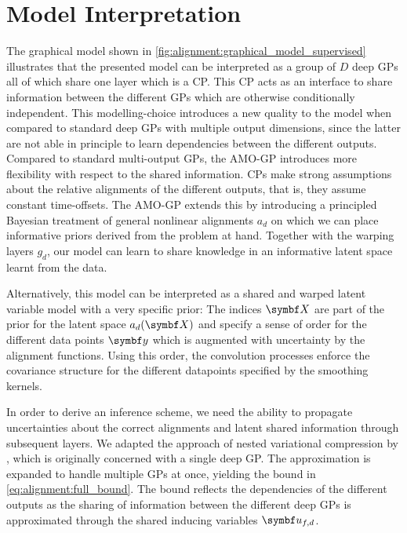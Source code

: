 \section{Model Interpretation}
\label{toc:alignment:interpretation}
The graphical model shown in \cref{fig:alignment:graphical_model_supervised} illustrates that the presented model can be interpreted as a group of $D$ deep GPs all of which share one layer which is a CP.
This CP acts as an interface to share information between the different GPs which are otherwise conditionally independent.
This modelling-choice introduces a new quality to the model when compared to standard deep GPs with multiple output dimensions, since the latter are not able in principle to learn dependencies between the different outputs.
Compared to standard multi-output GPs, the AMO-GP introduces more flexibility with respect to the shared information.
CPs make strong assumptions about the relative alignments of the different outputs, that is, they assume constant time-offsets.
The AMO-GP extends this by introducing a principled Bayesian treatment of general nonlinear alignments $a_d$ on which we can place informative priors derived from the problem at hand.
Together with the warping layers $g_d$, our model can learn to share knowledge in an informative latent space learnt from the data.

Alternatively, this model can be interpreted as a shared and warped latent variable model with a very specific prior:
The indices $\mat{X}$ are part of the prior for the latent space $a_d(\mat{X})$ and specify a sense of order for the different data points $\mat{y}$ which is augmented with uncertainty by the alignment functions.
Using this order, the convolution processes enforce the covariance structure for the different datapoints specified by the smoothing kernels.

In order to derive an inference scheme, we need the ability to propagate uncertainties about the correct alignments and latent shared information through subsequent layers.
We adapted the approach of nested variational compression by \textcite{hensman_nested_2014}, which is originally concerned with a single deep GP.
The approximation is expanded to handle multiple GPs at once, yielding the bound in \cref{eq:alignment:full_bound}.
The bound reflects the dependencies of the different outputs as the sharing of information between the different deep GPs is approximated through the shared inducing variables $\rv{u}_{f,d}$.


